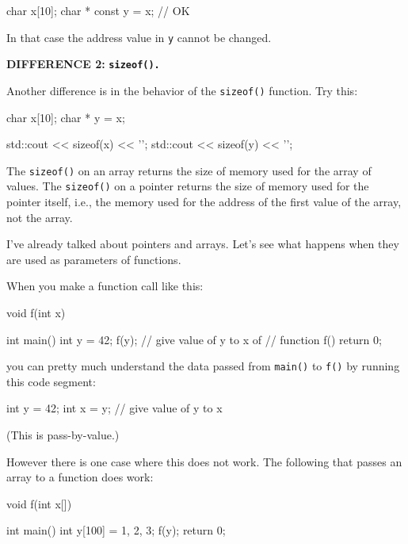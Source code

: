 \begin{consolethree}[escapeinside=||]
char x[10];
char * const y = x; // OK
\end{consolethree}

In that case the address value in \texttt{y} cannot be changed.

\textbf{DIFFERENCE 2:} \texttt{\textbf{sizeof().}}

Another difference is in the behavior of the \texttt{sizeof()} function. Try this:

\begin{consolethree}[escapeinside=||]
char x[10];
char * y = x;

std::cout << sizeof(x) << '\n';
std::cout << sizeof(y) << '\n';
\end{consolethree}

The \texttt{sizeof()} on an array returns the size of memory used for the array of values. The \texttt{sizeof()} on a pointer returns the size of memory used for the pointer itself, i.e., the memory used for the address of the first value of the array, not the array.


\newpage{}

I've already talked about pointers and arrays. Let's see what happens
when they are used as parameters of functions.

When you make a function call like this:

\begin{consolethree}[escapeinside=||]
void f(int x)
{}

int main()
{
    int y = 42;
    f(y); // give value of y to x of
          // function f()
    return 0;
}
\end{consolethree}

you can pretty much understand the data passed from \texttt{main()} to
\texttt{f()} by running this code segment:

\begin{consolethree}[escapeinside=||]
int y = 42;
int x = y; // give value of y to x
\end{consolethree}

(This is pass-by-value.)

However there is one case where this does not work. The following that
passes an array to a function does work:

\begin{consolethree}[escapeinside=||]
void f(int x[])
{}

int main()
{
    int y[100] = {1, 2, 3};
    f(y);
    return 0;
}
\end{consolethree}

